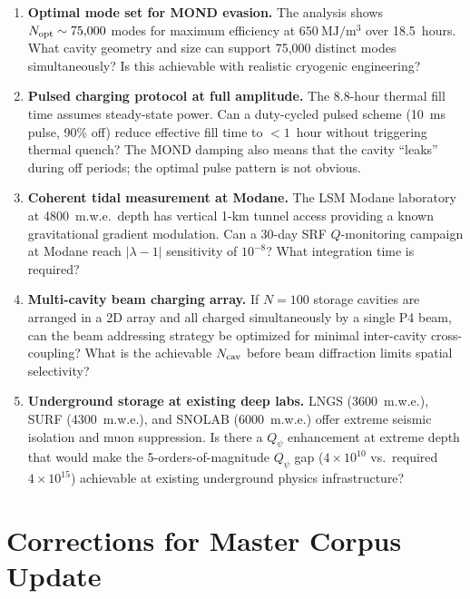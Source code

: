 \documentclass[aps,prd,twocolumn,superscriptaddress]{revtex4-2}
\newcommand{\lam}{|\lambda-1|}
\begin{document}
\begin{enumerate}
\item \textbf{Optimal mode set for MOND evasion.}
The analysis shows $N_{\rm opt} \sim 75{,}000$ modes for maximum
efficiency at $650~\mathrm{MJ/m^3}$ over 18.5~hours.  What cavity
geometry and size can support 75{,}000 distinct modes simultaneously?
Is this achievable with realistic cryogenic engineering?

\item \textbf{Pulsed charging protocol at full amplitude.}
The 8.8-hour thermal fill time assumes steady-state power.  Can a
duty-cycled pulsed scheme (10~ms pulse, 90\% off) reduce effective
fill time to $<1$~hour without triggering thermal quench?
The MOND damping also means that the cavity ``leaks'' during off periods;
the optimal pulse pattern is not obvious.

\item \textbf{Coherent tidal measurement at Modane.}
The LSM Modane laboratory at 4800~m.w.e.\ depth has vertical 1-km
tunnel access providing a known gravitational gradient modulation.
Can a 30-day SRF $Q$-monitoring campaign at Modane reach
$\lam$ sensitivity of $10^{-8}$?  What integration time is required?

\item \textbf{Multi-cavity beam charging array.}
If $N = 100$ storage cavities are arranged in a 2D array and all
charged simultaneously by a single P4 beam, can the beam addressing
strategy be optimized for minimal inter-cavity cross-coupling?
What is the achievable $N_{\rm cav}$ before beam diffraction limits
spatial selectivity?

\item \textbf{Underground storage at existing deep labs.}
LNGS (3600~m.w.e.), SURF (4300~m.w.e.), and SNOLAB (6000~m.w.e.)
offer extreme seismic isolation and muon suppression.  Is there a
$Q_\psi$ enhancement at extreme depth that would make the
5-orders-of-magnitude $Q_\psi$ gap ($4\times 10^{10}$ vs.\ required
$4\times 10^{15}$) achievable at existing underground physics
infrastructure?
\end{enumerate}

\section{Corrections for Master Corpus Update}
\label{sec:corpus}
\end{document}
